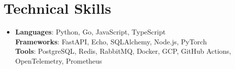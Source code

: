 \documentclass[letterpaper,11pt]{article}
\begin{document}
\vspace{-4pt}
\section{Technical Skills}
\begin{itemize}[leftmargin=0.15in, label={}, topsep=0pt, itemsep=0pt, parsep=0pt, partopsep=0pt]
  \item{\fontsize{9.0pt}{9.25pt}\selectfont
   \textbf{Languages}{: Python, Go, JavaScript, TypeScript} \\
   \textbf{Frameworks}{: FastAPI, Echo, SQLAlchemy, Node.js, PyTorch} \\
   \textbf{Tools}{: PostgreSQL, Redis, RabbitMQ, Docker, GCP, GitHub Actions, OpenTelemetry, Prometheus} \\
  }
\end{itemize}
\end{document}
